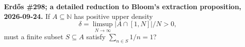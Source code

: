 \textbf{Erd\H{o}s \#298; a detailed reduction to Bloom's extraction proposition, 2026-09-24.}
If $A\subseteq\mathbb N$ has positive upper density
\[
\delta=\limsup_{N\to\infty}|A\cap[1,N]|/N>0,
\]
must a finite subset $S\subseteq A$ satisfy $\sum_{n\in S}1/n=1$?
